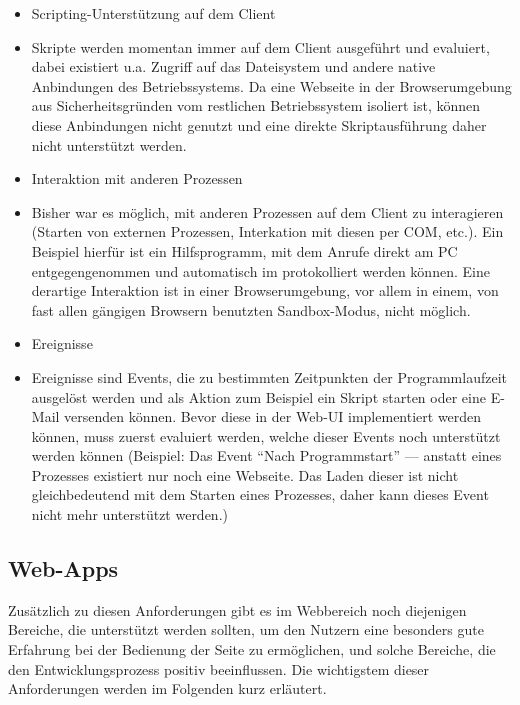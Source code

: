 \begin{itemize}
    \item{Scripting-Unterstützung auf dem Client}
    \item[] Skripte werden momentan immer auf dem Client ausgeführt und evaluiert, dabei existiert u.a. Zugriff auf das Dateisystem und andere native Anbindungen des Betriebssystems. Da eine Webseite in der Browserumgebung aus Sicherheitsgründen vom restlichen Betriebssystem isoliert ist, können diese Anbindungen nicht genutzt und eine direkte Skriptausführung daher nicht unterstützt werden. 
    \item{Interaktion mit anderen Prozessen}
    \item[] Bisher war es möglich, mit anderen Prozessen auf dem Client zu interagieren (Starten von externen Prozessen, Interkation mit diesen per \gls{COM}, etc.). Ein Beispiel hierfür ist ein Hilfsprogramm, mit dem Anrufe direkt am PC entgegengenommen und automatisch im  protokolliert werden können. Eine derartige Interaktion ist in einer Browserumgebung, vor allem in einem, von fast allen gängigen Browsern benutzten Sandbox-Modus, nicht möglich.
    \item{Ereignisse} 
    \item[] Ereignisse sind Events, die zu bestimmten Zeitpunkten der Programmlaufzeit ausgelöst werden und als Aktion zum Beispiel ein Skript starten oder eine E-Mail versenden können. Bevor diese in der Web-UI implementiert werden können, muss zuerst evaluiert werden, welche dieser Events noch unterstützt werden können (Beispiel: Das Event ``Nach Programmstart'' --- anstatt eines Prozesses existiert nur noch eine Webseite. Das Laden dieser ist nicht gleichbedeutend mit dem Starten eines Prozesses, daher kann dieses Event nicht mehr unterstützt werden.)
\end{itemize}

\subsection{Web-Apps}
Zusätzlich zu diesen Anforderungen gibt es im Webbereich noch diejenigen Bereiche, die unterstützt werden sollten, um den Nutzern eine besonders gute Erfahrung bei der Bedienung der Seite zu ermöglichen, und solche Bereiche, die den Entwicklungsprozess positiv beeinflussen. Die wichtigstem dieser Anforderungen werden im Folgenden kurz erläutert. 

